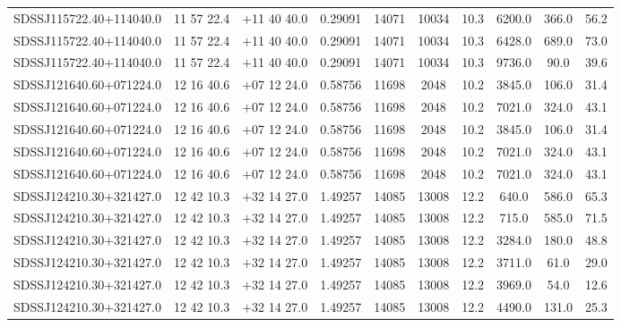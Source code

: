 \begin{landscape}
\begin{center}
\begin{longtable}{l c c c c c c c c c}
SDSSJ115722.40+114040.0  & 11 57 22.4  &         $+$11 40 40.0  &       0.29091  & 14071  &   10034  &      10.3  &      6200.0  &  366.0  &  56.2  \\
SDSSJ115722.40+114040.0  & 11 57 22.4  &         $+$11 40 40.0  &       0.29091  & 14071  &   10034  &      10.3  &      6428.0  &  689.0  &  73.0  \\
SDSSJ115722.40+114040.0  & 11 57 22.4  &         $+$11 40 40.0  &       0.29091  & 14071  &   10034  &      10.3  &      9736.0  &  90.0  &   39.6  \\
SDSSJ121640.60+071224.0  & 12 16 40.6  &         $+$07 12 24.0  &       0.58756  & 11698  &   2048  &       10.2  &      3845.0  &  106.0  &  31.4  \\
SDSSJ121640.60+071224.0  & 12 16 40.6  &         $+$07 12 24.0  &       0.58756  & 11698  &   2048  &       10.2  &      7021.0  &  324.0  &  43.1  \\
SDSSJ121640.60+071224.0  & 12 16 40.6  &         $+$07 12 24.0  &       0.58756  & 11698  &   2048  &       10.2  &      3845.0  &  106.0  &  31.4  \\
SDSSJ121640.60+071224.0  & 12 16 40.6  &         $+$07 12 24.0  &       0.58756  & 11698  &   2048  &       10.2  &      7021.0  &  324.0  &  43.1  \\
SDSSJ121640.60+071224.0  & 12 16 40.6  &         $+$07 12 24.0  &       0.58756  & 11698  &   2048  &       10.2  &      7021.0  &  324.0  &  43.1  \\
SDSSJ124210.30+321427.0  & 12 42 10.3  &         $+$32 14 27.0  &       1.49257  & 14085  &   13008  &      12.2  &      640.0  &   586.0  &  65.3  \\
SDSSJ124210.30+321427.0  & 12 42 10.3  &         $+$32 14 27.0  &       1.49257  & 14085  &   13008  &      12.2  &      715.0  &   585.0  &  71.5  \\
SDSSJ124210.30+321427.0  & 12 42 10.3  &         $+$32 14 27.0  &       1.49257  & 14085  &   13008  &      12.2  &      3284.0  &  180.0  &  48.8  \\
SDSSJ124210.30+321427.0  & 12 42 10.3  &         $+$32 14 27.0  &       1.49257  & 14085  &   13008  &      12.2  &      3711.0  &  61.0  &   29.0  \\
SDSSJ124210.30+321427.0  & 12 42 10.3  &         $+$32 14 27.0  &       1.49257  & 14085  &   13008  &      12.2  &      3969.0  &  54.0  &   12.6  \\
SDSSJ124210.30+321427.0  & 12 42 10.3  &         $+$32 14 27.0  &       1.49257  & 14085  &   13008  &      12.2  &      4490.0  &  131.0  &  25.3  \\

\end{longtable}
\end{center}
\end{landscape}
